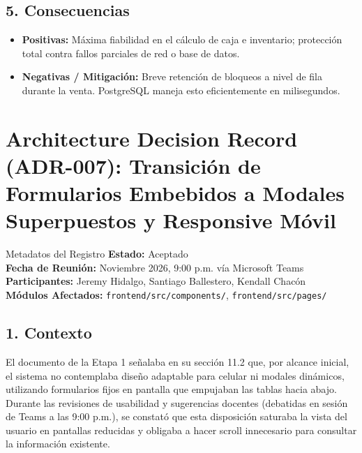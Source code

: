 \documentclass[11pt,a4paper]{article}
\begin{document}
\subsection{5. Consecuencias}
\begin{itemize}[leftmargin=*]
    \item \textbf{Positivas:} Máxima fiabilidad en el cálculo de caja e inventario; protección total contra fallos parciales de red o base de datos.
    \item \textbf{Negativas / Mitigación:} Breve retención de bloqueos a nivel de fila durante la venta. PostgreSQL maneja esto eficientemente en milisegundos.
\end{itemize}

\newpage

\section{Architecture Decision Record (ADR-007): Transición de Formularios Embebidos a Modales Superpuestos y Responsive Móvil}

\begin{adrbox}{Metadatos del Registro}
\textbf{Estado:} Aceptado \\
\textbf{Fecha de Reunión:} Noviembre 2026, 9:00 p.m. vía Microsoft Teams \\
\textbf{Participantes:} Jeremy Hidalgo, Santiago Ballestero, Kendall Chacón \\
\textbf{Módulos Afectados:} \texttt{frontend/src/components/}, \texttt{frontend/src/pages/}
\end{adrbox}

\subsection{1. Contexto}
El documento de la Etapa 1 señalaba en su sección 11.2 que, por alcance inicial, el sistema no contemplaba diseño adaptable para celular ni modales dinámicos, utilizando formularios fijos en pantalla que empujaban las tablas hacia abajo. Durante las revisiones de usabilidad y sugerencias docentes (debatidas en sesión de Teams a las 9:00 p.m.), se constató que esta disposición saturaba la vista del usuario en pantallas reducidas y obligaba a hacer scroll innecesario para consultar la información existente.
\end{document}
